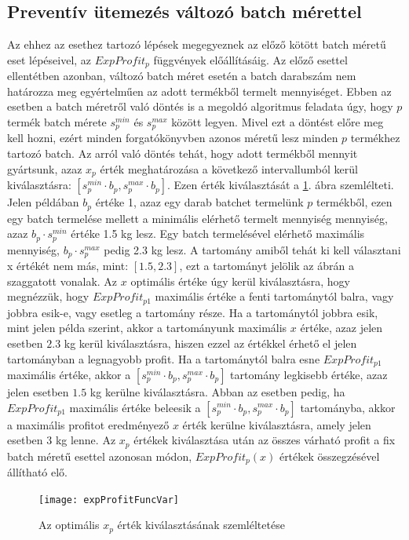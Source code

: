 \subsection{Preventív ütemezés változó batch mérettel} \label{variable_batch_size_modell}
Az ehhez az esethez tartozó lépések megegyeznek az előző kötött batch méretű eset lépéseivel, az $ExpProfit_p$ függvények előállításáig.
Az előző esettel ellentétben azonban, változó batch méret esetén a batch darabszám nem határozza meg egyértelműen az adott termékből termelt mennyiséget. 
Ebben az esetben a batch méretről való döntés is a megoldó algoritmus feladata úgy, hogy $p$ termék batch mérete $s_p^{min}$ és $s_p^{max}$ között legyen.
Mivel ezt a döntést előre meg kell hozni, ezért minden forgatókönyvben azonos méretű lesz minden $p$ termékhez tartozó batch.
Az arról való döntés tehát, hogy adott termékből mennyit gyártsunk, azaz $x_p$ érték meghatározása a következő intervallumból kerül kiválasztásra: $[s_p^{min} \cdot b_p , s_p^{max} \cdot b_p]$.
Ezen érték kiválasztását a \ref{expProfit_func_var}. ábra szemlélteti.
Jelen példában $b_p$ értéke 1, azaz egy darab batchet termelünk $p$ termékből, ezen egy batch termelése mellett a minimális elérhető  termelt mennyiség mennyiség, azaz $b_p \cdot s_p^{min}$ értéke 1.5 kg lesz.
Egy batch termelésével elérhető maximális mennyiség, $b_p \cdot s_p^{max}$ pedig 2.3 kg lesz.
A tartomány amiből tehát ki kell választani x értékét nem más, mint: $[1.5 , 2.3]$, ezt a tartományt jelölik az ábrán a szaggatott vonalak.
Az $x$ optimális értéke úgy kerül kiválasztásra, hogy megnézzük, hogy $ExpProfit_{p1}$ maximális értéke a fenti tartománytól balra, vagy jobbra esik-e, vagy esetleg a tartomány része.
Ha a tartománytól jobbra esik, mint jelen példa szerint, akkor a tartományunk maximális $x$ értéke, azaz jelen esetben $2.3$ kg kerül kiválasztásra, hiszen ezzel az értékkel érhető el jelen tartományban a legnagyobb profit.
Ha a tartománytól balra esne $ExpProfit_{p1}$ maximális értéke, akkor a $[s_p^{min} \cdot b_p , s_p^{max} \cdot b_p]$ tartomány legkisebb értéke, azaz jelen esetben $1.5$ kg kerülne kiválasztásra.
Abban az esetben pedig, ha $ExpProfit_{p1}$ maximális értéke beleesik a $[s_p^{min} \cdot b_p , s_p^{max} \cdot b_p]$ tartományba, akkor a maximális profitot eredményező $x$ érték kerülne kiválasztásra, amely jelen esetben 3 kg lenne.
Az $x_p$ értékek kiválasztása után az összes várható profit a fix batch méretű esettel azonosan módon, $ExpProfit_p(x)$ értékek összegzésével állítható elő. 
\begin{figure}[H]
\begin{center}
\texttt{[image: expProfitFuncVar]}
\caption{Az optimális $x_p$ érték kiválasztásának szemléltetése}
\label{expProfit_func_var}
\end{center}
\end{figure}
